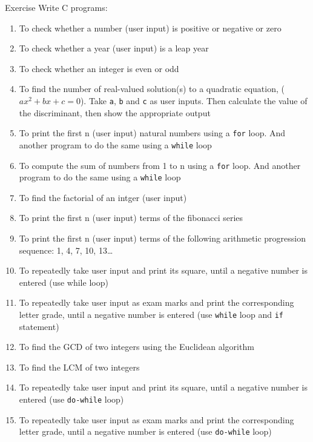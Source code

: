 \documentclass[12pt, aspectratio=169]{beamer}
\begin{document}
    \begin{frame}{Exercise}
        Write C programs:
        \begin{enumerate}
            \item To check whether a number (user input) is positive or negative or zero
            \item To check whether a year (user input) is a leap year
            \item To check whether an integer is even or odd
            \item To find the number of real-valued solution(s) to a quadratic equation, (\(ax^2+bx+c=0\)). Take \texttt{a}, \texttt{b} and \texttt{c} as user inputs. Then calculate the value of the discriminant, then show the appropriate output
            \item To print the first n (user input) natural numbers using a \texttt{for} loop. And another program to do the same using a \texttt{while} loop
            \item To compute the sum of numbers from 1 to n using a \texttt{for} loop. And another program to do the same using a \texttt{while} loop
            \item To find the factorial of an intger (user input)
            \item To print the first n (user input) terms of the fibonacci series
            \item To print the first n (user input) terms of the following arithmetic progression sequence: 1, 4, 7, 10, 13\dots
            \item To repeatedly take user input and print its square, until a negative number is entered (use while loop)
            \item To repeatedly take user input as exam marks and print the corresponding letter grade, until a negative number is entered (use \texttt{while} loop and \texttt{if} statement)
            \item To find the GCD of two integers using the Euclidean algorithm
            \item To find the LCM of two integers
            \item To repeatedly take user input and print its square, until a negative number is entered (use \texttt{do-while} loop)
            \item To repeatedly take user input as exam marks and print the corresponding letter grade, until a negative number is entered (use \texttt{do-while} loop)

\end{enumerate}
\end{frame}
\end{document}
